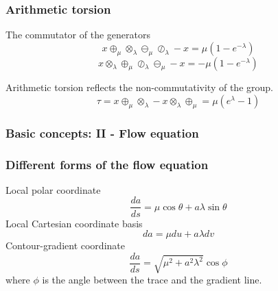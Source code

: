 \documentclass[aspectratio=169]{beamer}
\begin{document}
\begin{frame}
    \frametitle{Arithmetic torsion}
    The commutator of the generators
    \begin{equation}
        x \oplus_\mu \otimes_\lambda \ominus_\mu \oslash_\lambda - x = \mu(1 - e^{-\lambda})\label{eq:commutator1}
    \end{equation}
    \begin{equation}
        x \otimes_\lambda \oplus_\mu \oslash_\lambda \ominus_\mu - x = - \mu(1 - e^{-\lambda})\label{eq:commutator2}
    \end{equation}

    Arithmetic torsion reflects the non-commutativity of the group.
    \begin{equation}
        \tau = x \oplus_\mu \otimes_\lambda - x \otimes_\lambda \oplus_\mu = \mu(e^\lambda - 1)\label{eq:torsion}
    \end{equation}
\end{frame}

\begin{frame}
    \frametitle{Basic concepts: II - Flow equation}
    \begin{figure}[ht]\centering
    \end{figure}
\end{frame}

\begin{frame}
    \frametitle{Different forms of the flow equation}
    Local polar coordinate
    \begin{equation}
        \frac{da}{ds} = \mu \cos \theta + a \lambda \sin \theta\label{eq:polar-flow}
    \end{equation}
    Local Cartesian coordinate basis
    \begin{equation}
        da = \mu du + a \lambda dv \label{eq:cartesian-flow}
    \end{equation}
    Contour-gradient coordinate
    \begin{equation}
        \frac{da}{ds} = \sqrt {\mu^2 + a^2 \lambda^2} \cos \phi\label{eq:contour-gradient-flow}
    \end{equation}
    where $\phi$ is the angle between the trace and the gradient line.
\end{frame}
\end{document}
